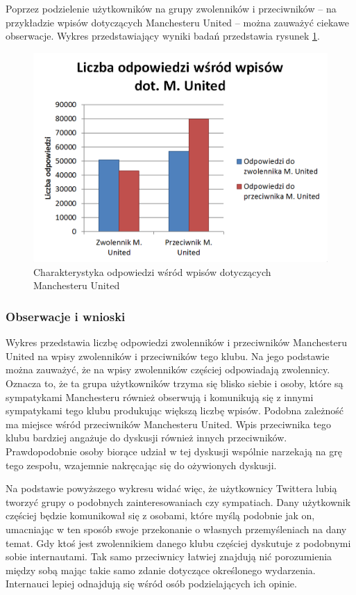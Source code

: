 Poprzez podzielenie użytkowników na grupy zwolenników i przeciwników -- na
przykładzie wpisów dotyczących Manchesteru United -- można zauważyć ciekawe
obserwacje. Wykres przedstawiający wyniki badań przedstawia rysunek 
\ref{image:replies-munited}.

\clearpage
\begin{figure}[ht!]
\centering
\includegraphics[width=120mm]{img/replies-munited.png}
\caption{Charakterystyka odpowiedzi wśród wpisów dotyczących Manchesteru United}
\label{image:replies-munited}
\end{figure}

\subsubsection{Obserwacje i wnioski}
Wykres przedstawia liczbę odpowiedzi zwolenników i przeciwników Manchesteru 
United na wpisy zwolenników i przeciwników tego klubu. Na jego podstawie można
zauważyć, że na wpisy zwolenników częściej odpowiadają zwolennicy. 
Oznacza to, że ta grupa użytkowników trzyma się blisko siebie i osoby, które
są sympatykami Manchesteru również obserwują i komunikują się z innymi 
sympatykami tego klubu produkując większą liczbę wpisów.
Podobna zależność ma miejsce wśród przeciwników Manchesteru United.
Wpis przeciwnika tego klubu bardziej angażuje do dyskusji również innych
przeciwników. Prawdopodobnie osoby biorące udział w tej dyskusji wspólnie
narzekają na grę tego zespołu, wzajemnie nakręcając się do ożywionych dyskusji.

Na podstawie powyższego wykresu widać więc, że użytkownicy Twittera lubią 
tworzyć grupy o podobnych zainteresowaniach czy sympatiach. Dany użytkownik
częściej będzie komunikował się z osobami, które myślą podobnie jak on,
umacniając w ten sposób swoje przekonanie o własnych przemyśleniach na dany temat.
Gdy ktoś jest zwolennikiem danego klubu częściej dyskutuje z podobnymi sobie
internautami. Tak samo przeciwnicy łatwiej znajdują nić porozumienia między sobą
mając takie samo zdanie dotyczące określonego wydarzenia. Internauci lepiej
odnajdują się wśród osób podzielających ich opinie.  









